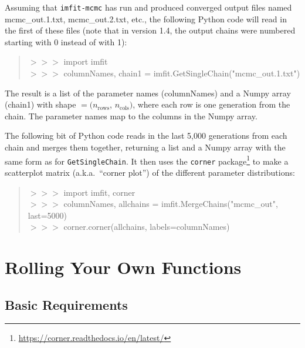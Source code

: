 \documentclass[10pt,a4paper,article]{memoir}
\newcommand{\imfitmcmc}{\texttt{imfit-mcmc}}
\begin{document}
Assuming that \imfitmcmc{} has run and produced converged output files 
named mcmc\_out.1.txt, mcmc\_out.2.txt, etc., the following Python code will read in the
first of these files (note that in version 1.4, the output chains were numbered
starting with 0 instead of with 1):
\begin{quote}
$>>>$ import imfit \\
$>>>$ columnNames, chain1 = imfit.GetSingleChain("mcmc\_out.1.txt")
\end{quote}

The result is a list of the parameter names (columnNames) and a Numpy
array (chain1) with shape $= (n_{\textrm{rows}}$, $n_{\textrm{cols}})$,
where each row is one generation from the chain. The parameter names
map to the columns in the Numpy array.

The following bit of Python code reads in the last 5,000 generations
from each chain and merges them together, returning a list and a Numpy
array with the same form as for \texttt{GetSingleChain}. It then uses
the \texttt{corner}
package\footnote{\url{https://corner.readthedocs.io/en/latest/}}
\citep{corner} to make a scatterplot matrix (a.k.a.\ ``corner plot'') of the
different parameter distributions:

\begin{quote}
$>>>$ import imfit, corner \\
$>>>$ columnNames, allchains = imfit.MergeChains("mcmc\_out", last=5000) \\
$>>>$ corner.corner(allchains, labels=columnNames)
\end{quote}






\newpage

\chapter{Rolling Your Own Functions}

\section{Basic Requirements}
\end{document}
